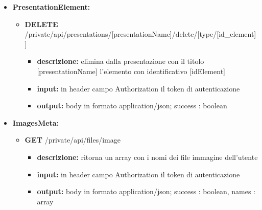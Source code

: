 {{\begin{itemize}
\begin{itemize}
			\item  \textbf{PUT} /private/api/presentations/[presentationName]/element
				\begin{itemize} 
				\item \textbf{descrizione:} sostituisce nella presentazione dell'utente l'elemento passato nel body della richiesta
				\item \textbf{input:} in header campo Authorization il token di autenticazione, nel body in formato application/json l'oggetto: element : object
				\item \textbf{output:} body in formato application/json; success : boolean
				\end{itemize}
			\end{itemize}
				
		\item \textbf{PresentationElement:}
			\begin{itemize}
			\item   \textbf{DELETE} /private/api/presentations/[presentationName]/delete/[type/[id\_element]]
				\begin{itemize} 
				\item \textbf{descrizione:} elimina dalla presentazione con il titolo [presentationName] l'elemento con identificativo [idElement]						
				\item \textbf{input:} in header campo Authorization il token di autenticazione
				\item \textbf{output:} body in formato application/json; success : boolean
				\end{itemize}
			\end{itemize}
			
			
		\item \textbf{ImagesMeta:}
			\begin{itemize}
			\item   \textbf{GET} /private/api/files/image 
				\begin{itemize} 
				\item \textbf{descrizione:} ritorna un array con i nomi dei file immagine dell'utente
				\item \textbf{input:} in header campo Authorization il token di autenticazione
				\item \textbf{output:} body in formato application/json; success : boolean, names : array
				\end{itemize}
			\end{itemize}
			

\end{itemize}}}
